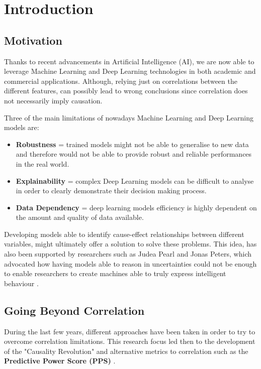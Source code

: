 \chapter{Introduction}
\section{Motivation}
\vspace{-0.1cm}
Thanks to recent advancements in Artificial Intelligence (AI), we are now able to leverage Machine Learning and Deep Learning technologies in both academic and commercial applications. Although, relying just on correlations between the different features, can possibly lead to wrong conclusions since correlation does not necessarily imply causation.

Three of the main limitations of nowadays Machine Learning and Deep Learning models are: 
\vspace{-0.2cm}
\begin{itemize}
    \item \textbf{Robustness} = trained models might not be able to generalise to new data and therefore would not be able to provide robust and reliable performances in the real world.
    \item \textbf{Explainability} = complex Deep Learning models can be difficult to analyse in order to clearly demonstrate their decision making process. 
    \item \textbf{Data Dependency} = deep learning models efficiency is highly dependent on the amount and quality of data available. 
\end{itemize}
\vspace{-0.2cm}
Developing models able to identify cause-effect relationships between different variables, might ultimately offer a solution to solve these problems. This idea, has also been supported by researchers such as Judea Pearl and Jonas Peters, which advocated how having models able to reason in uncertainties could not be enough to enable researchers to create machines able to truly express intelligent behaviour \cite{art_perl}.

\section{Going Beyond Correlation}
During the last few years, different approaches have been taken in order to try to overcome correlation limitations. This research focus led then to the development of the "Causality Revolution" and alternative metrics to correlation such as the \textbf{Predictive Power Score (PPS)} \cite{ppc}.

